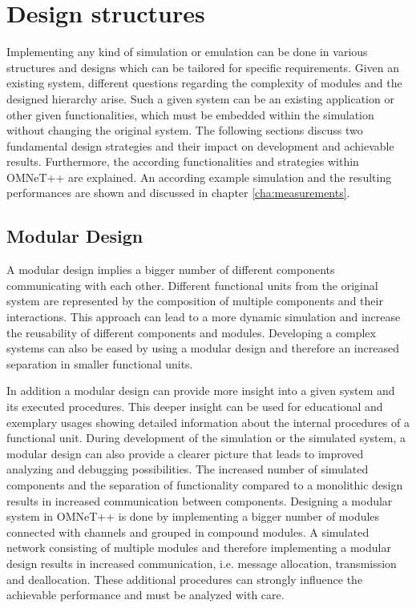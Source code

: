 \chapter{Design structures}
\label{cha:design}
Implementing any kind of simulation or emulation can be done in various structures and designs which can be tailored for specific requirements.
Given an existing system, different questions regarding the complexity of modules and the designed hierarchy arise.
Such a given system can be an existing application or other given functionalities, which must be embedded within the simulation without changing the original system.
The following sections discuss two fundamental design strategies and their impact on development and achievable results.
Furthermore, the according functionalities and strategies within OMNeT++ are explained.
An according example simulation and the resulting performances are shown and discussed in chapter \ref{cha:measurements}.

\section{Modular Design}
\label{sec:design_modular}
A modular design implies a bigger number of different components communicating with each other.
Different functional units from the original system are represented by the composition of multiple components and their interactions.
This approach can lead to a more dynamic simulation and increase the reusability of different components and modules.
Developing a complex systems can also be eased by using a modular design and therefore an increased separation in smaller functional units.

In addition a modular design can provide more insight into a given system and its executed procedures.
This deeper insight can be used for educational and exemplary usages showing detailed information about the internal procedures of a functional unit.
During development of the simulation or the simulated system, a modular design can also provide a clearer picture that leads to improved analyzing and debugging possibilities.
The increased number of simulated components and the separation of functionality compared to a monolithic design results in increased communication between components.
Designing a modular system in OMNeT++ is done by implementing a bigger number of modules connected with channels and grouped in compound modules.
A simulated network consisting of multiple modules and therefore implementing a modular design results in increased communication, i.e. message allocation, transmission and deallocation.
These additional procedures can strongly influence the achievable performance and must be analyzed with care.

